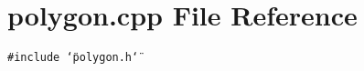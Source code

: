 \section{polygon.cpp File Reference}
\label{polygon_8cpp}
{\tt \#include \char`\"{}polygon.h\char`\"{}}\par
